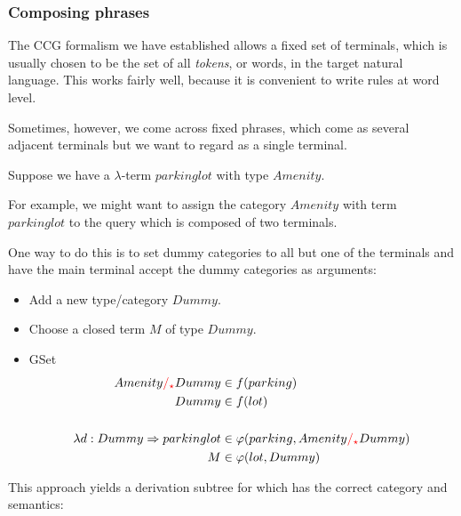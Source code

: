 \documentclass[main.tex]{subfiles}
\begin{document}
\subsubsection{Composing phrases}
The CCG formalism we have established allows a fixed set of terminals,
which is usually chosen to be the set of all \emph{tokens}, or words,
in the target natural language. This works fairly well, because it is
convenient to write rules at word level.

Sometimes, however, we come across fixed phrases, which come as several
adjacent terminals but we want to regard as a single terminal.

\begin{example}
    Suppose we have a $\lambda$-term $parkinglot$ with type $Amenity$.
    
    For example, we might want to assign the category $Amenity$ with term
    $parkinglot$
    to the query  which is composed of two terminals.
    
    One way to do this is to set dummy categories to all but one of the
    terminals and have the main terminal accept the dummy categories as
    arguments:
   
    \begin{itemize}
        \item Add a new type/category $Dummy$.
        \item Choose a closed term $M$ of type $Dummy$.
        \item GSet
            \begin{align*}
                Amenity \textcolor{red}{/_{\star}} Dummy &\in f(parking)\\
                Dummy &\in f(lot) \\
                \\
                \lambda d: Dummy \Rightarrow parkinglot &\in \varphi(parking, Amenity \textcolor{red}{/_{\star}} Dummy)  \\
                M &\in \varphi(lot, Dummy) \\
            \end{align*}
    \end{itemize}
    
    This approach yields a derivation subtree for  which
    has the correct category and semantics:
\end{example}
\end{document}
